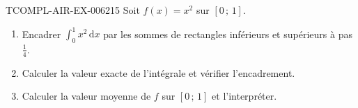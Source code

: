 \begin{exercice}{TCOMPL-AIR-EX-006}{2}{15}
Soit $f(x)=x^2$ sur $[0\,;\,1]$.
\begin{enumerate}
  \item Encadrer $\displaystyle\int_0^1 x^2\,\mathrm{d}x$ par les sommes de
        rectangles inférieurs et supérieurs à pas $\tfrac14$.
  \item Calculer la valeur exacte de l'intégrale et vérifier l'encadrement.
  \item Calculer la valeur moyenne de $f$ sur $[0\,;\,1]$ et l'interpréter.
\end{enumerate}
\end{exercice}
